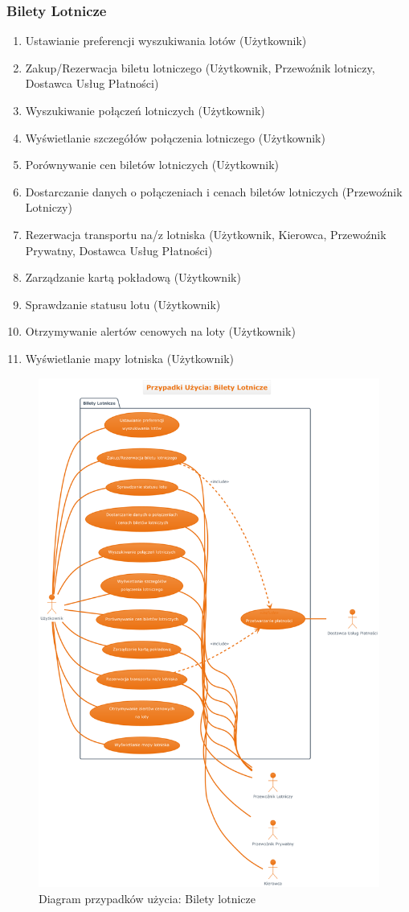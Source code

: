 \documentclass[a4paper,12pt]{article}
\begin{document}
\subsubsection{Bilety Lotnicze}
\begin{enumerate}[label=\arabic*.]
    \item Ustawianie preferencji wyszukiwania lotów (Użytkownik)
    \item Zakup/Rezerwacja biletu lotniczego (Użytkownik, Przewoźnik lotniczy, Dostawca Usług Płatności)
    \item Wyszukiwanie połączeń lotniczych (Użytkownik)
    \item Wyświetlanie szczegółów połączenia lotniczego (Użytkownik)
    \item Porównywanie cen biletów lotniczych (Użytkownik)
    \item Dostarczanie danych o połączeniach i cenach biletów lotniczych (Przewoźnik Lotniczy)
    \item Rezerwacja transportu na/z lotniska (Użytkownik, Kierowca, Przewoźnik Prywatny, Dostawca Usług Płatności)
    \item Zarządzanie kartą pokładową (Użytkownik)
    \item Sprawdzanie statusu lotu (Użytkownik)
    \item Otrzymywanie alertów cenowych na loty (Użytkownik)
    \item Wyświetlanie mapy lotniska (Użytkownik)
\end{enumerate}
\begin{figure}[H]
    \centering
    \includegraphics[width=0.8\linewidth]{diagramy/przypadki_uzycia/images/diagram_bilety_lotnicze_1.png}
    \caption{Diagram przypadków użycia: Bilety lotnicze}
    \label{fig:diag_bl_1}
\end{figure}
\end{document}

